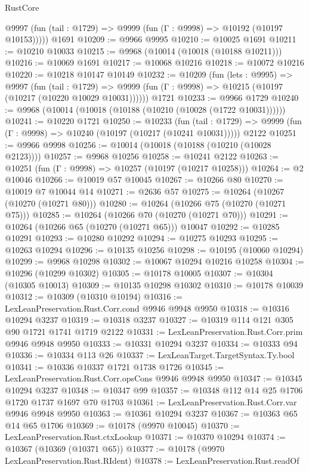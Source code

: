 \begin{lexlean}{RustCore}
\begin{coremodule}
      @9997 (fun (tail : @1729) => @9999 (fun (Γ : @9998) => @10192 (@10197 @10153)))))
    @1691
@10209 := @9966 @9995
@10210 := @10025 @1691
@10211 := @10210 @10033
@10215 := @9968 (@10014 (@10018 (@10188 @10211)))
@10216 := @10069 @1691
@10217 := @10068 @10216
@10218 := @10072 @10216
@10220 := @10218 @10147 @10149
@10232 := @10209
    (fun (lets : @9995) =>
    @9997
      (fun (tail : @1729) =>
      @9999 (fun (Γ : @9998) => @10215 (@10197 (@10217 (@10220 @10029 @10031))))))
    @1721
@10233 := @9966 @1729
@10240 := @9968 (@10014 (@10018 (@10188 (@10210 (@10028 (@1722 @10031))))))
@10241 := @10220 @1721
@10250 := @10233
    (fun (tail : @1729) => @9999 (fun (Γ : @9998) => @10240 (@10197 (@10217 (@10241 @10031)))))
    @2122
@10251 := @9966 @9998
@10256 := @10014 (@10018 (@10188 (@10210 (@10028 @2123))))
@10257 := @9968 @10256
@10258 := @10241 @2122
@10263 := @10251 (fun (Γ : @9998) => @10257 (@10197 (@10217 @10258)))
@10264 := @2 @10046
@10266 := @10019 @57 @10045
@10267 := @10266 @80
@10270 := @10019 @7 @10044 @14
@10271 := @2636 @57
@10275 := @10264 (@10267 (@10270 (@10271 @80)))
@10280 := @10264 (@10266 @75 (@10270 (@10271 @75)))
@10285 := @10264 (@10266 @70 (@10270 (@10271 @70)))
@10291 := @10264 (@10266 @65 (@10270 (@10271 @65))) @10047
@10292 := @10285 @10291
@10293 := @10280 @10292
@10294 := @10275 @10293
@10295 := @10263 @10294
@10296 := @10135 @10256
@10298 := @10195 (@10060 @10294)
@10299 := @9968 @10298
@10302 := @10067 @10294 @10216 @10258
@10304 := @10296 (@10299 @10302)
@10305 := @10178 @10005
@10307 := @10304 (@10305 @10013)
@10309 := @10135 @10298 @10302
@10310 := @10178 @10039
@10312 := @10309 (@10310 @10194)
@10316 := LexLeanPreservation.Rust.Corr.cond @9946 @9948 @9950
@10318 := @10316 @10294 @3237
@10319 := @10318 @3237
@10327 := @10319 @114 @121 @305 @90 @1721 @1741 @1719 @2122
@10331 := LexLeanPreservation.Rust.Corr.prim @9946 @9948 @9950
@10333 := @10331 @10294 @3237
@10334 := @10333 @94
@10336 := @10334 @113 @26
@10337 := LexLeanTarget.TargetSyntax.Ty.bool
@10341 := @10336 @10337 @1721 @1738 @1726
@10345 := LexLeanPreservation.Rust.Corr.opsCons @9946 @9948 @9950
@10347 := @10345 @10294 @3237
@10348 := @10347 @99
@10357 := @10348 @112 @14 @25 @1706 @1720 @1737 @1697 @70 @1703
@10361 := LexLeanPreservation.Rust.Corr.var @9946 @9948 @9950
@10363 := @10361 @10294 @3237
@10367 := @10363 @65 @14 @65 @1706
@10369 := @10178 (@9970 @10045)
@10370 := LexLeanPreservation.Rust.ctxLookup
@10371 := @10370 @10294
@10374 := @10367 (@10369 (@10371 @65))
@10377 := @10178 (@9970 LexLeanPreservation.Rust.RIdent)
@10378 := LexLeanPreservation.Rust.readOf

\end{coremodule}
\end{lexlean}
